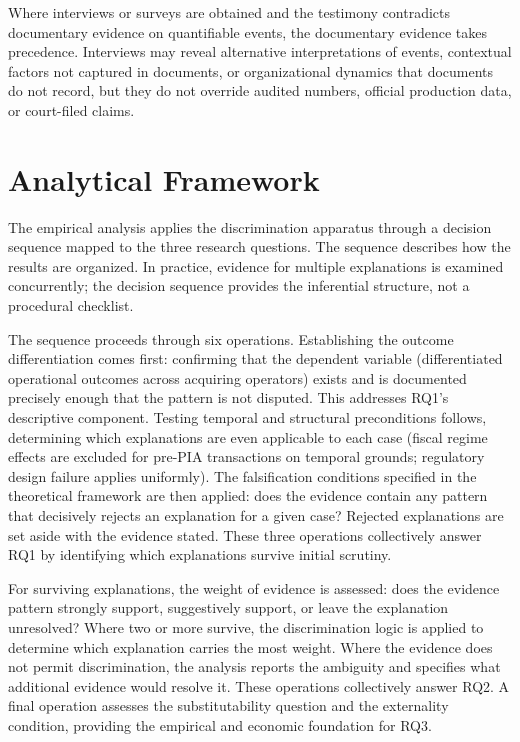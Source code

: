 Where interviews or surveys are obtained and the testimony contradicts
documentary evidence on quantifiable events, the documentary evidence
takes precedence. Interviews may reveal alternative interpretations of
events, contextual factors not captured in documents, or organizational
dynamics that documents do not record, but they do not override audited
numbers, official production data, or court-filed claims.

\hypertarget{analytical-framework}{%
\section{Analytical Framework}\label{analytical-framework}}

The empirical analysis applies the discrimination apparatus through a
decision sequence mapped to the three research questions. The sequence
describes how the results are organized. In practice, evidence for
multiple explanations is examined concurrently; the decision sequence
provides the inferential structure, not a procedural checklist.

The sequence proceeds through six operations. Establishing the outcome
differentiation comes first: confirming that the dependent variable
(differentiated operational outcomes across acquiring operators) exists
and is documented precisely enough that the pattern is not disputed.
This addresses RQ1's descriptive component. Testing temporal and
structural preconditions follows, determining which explanations are
even applicable to each case (fiscal regime effects are excluded for
pre-PIA transactions on temporal grounds; regulatory design failure
applies uniformly). The falsification conditions specified in the
theoretical framework are then applied: does the evidence contain any
pattern that decisively rejects an explanation for a given case?
Rejected explanations are set aside with the evidence stated. These
three operations collectively answer RQ1 by identifying which
explanations survive initial scrutiny.

For surviving explanations, the weight of evidence is assessed: does the
evidence pattern strongly support, suggestively support, or leave the
explanation unresolved? Where two or more survive, the discrimination
logic is applied to determine which explanation carries the most weight.
Where the evidence does not permit discrimination, the analysis reports
the ambiguity and specifies what additional evidence would resolve it.
These operations collectively answer RQ2. A final operation assesses the
substitutability question and the externality condition, providing the
empirical and economic foundation for RQ3.

